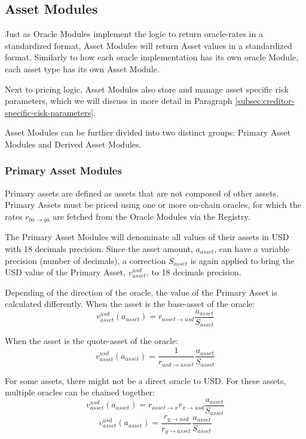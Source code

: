 \documentclass[sigconf,nonacm]{acmart}
\begin{document}
\subsection{Asset Modules}
Just as Oracle Modules implement the logic to return oracle-rates in a standardized format,
Asset Modules will return Asset values in a standardized format.
Similarly to how each oracle implementation has its own oracle Module, each asset type has its own Asset Module.

Next to pricing logic, Asset Modules also store and manage asset specific risk parameters, which we will discuss in more detail in Paragraph \ref{subsec:creditor-specific-cisk-parameters}.

Asset Modules can be further divided into two distinct groups: Primary Asset Modules and Derived Asset Modules.

\subsubsection{Primary Asset Modules}
Primary assets are defined as assets that are not composed of other assets.
Primary Assets must be priced using one or more on-chain oracles, for which the rates $r_{ba\rightarrow qa}$ are fetched from the Oracle Modules via the Registry.

The Primary Asset Modules will denominate all values of their assets in USD with 18 decimals precision.
Since the asset amount, $a_{asset}$, can have a variable precision (number of decimals),
a correction $S_{asset}$ is again applied to bring the USD value of the Primary Asset, $v_{asset}^{usd}$, to 18 decimals precision.

Depending of the direction of the oracle, the value of the Primary Asset is calculated differently.
When the asset is the base-asset of the oracle:
\begin{equation}
    v^{usd}_{asset}(a_{asset}) = r_{asset\rightarrow usd} \frac{a_{asset}}{S_{asset}}
\end{equation}

When the asset is the quote-asset of the oracle:
\begin{equation}
    v^{usd}_{asset}(a_{asset}) = \frac{1}{r_{usd\rightarrow asset}} \frac{a_{asset}}{S_{asset}}
\end{equation}

For some assets, there might not be a direct oracle to USD.
For these assets, multiple oracles can be chained together:
\begin{equation}
    v^{usd}_{asset}(a_{asset}) = r_{asset\rightarrow x} r_{x\rightarrow usd} \frac{a_{asset}}{S_{asset}}
\end{equation}
\begin{equation}
    v^{usd}_{asset}(a_{asset}) = \frac{r_{y\rightarrow usd}}{r_{y\rightarrow asset}} \frac{a_{asset}}{S_{asset}}
\end{equation}
\end{document}
